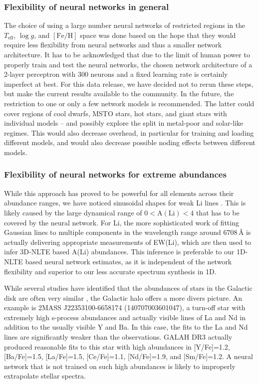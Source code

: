 \documentclass[
  journal=pasa,
  manuscript=research-paper, %
  year=2024,
  volume=37
]{cup-journal}
\newcommand{\Teff}{$T_\mathrm{eff}$\xspace}
\newcommand{\logg}{$\log g$\xspace}
\newcommand{\feh}{$\mathrm{[Fe/H]}$\xspace}
\newcommand{\TLF}{\Teff, \logg, and \feh}
\begin{document}
\subsubsection{Flexibility of neural networks in general}

The choice of using a large number neural networks of restricted regions in the \TLF space was done based on the hope that they would require less flexibility from neural networks and thus a smaller network architecture. It has to be acknowledged that due to the limit of human power to properly train and test the neural networks, the chosen network architecture of a 2-layer perceptron with 300 neurons and a fixed learning rate is certainly imperfect at best. For this data release, we have decided not to rerun these steps, but make the current results available to the community. In the future, the restriction to one or only a few network models is recommended. The latter could cover regions of cool dwarfs, MSTO stars, hot stars, and giant stars with individual models -- and possibly explore the split in metal-poor and solar-like regimes. This would also decrease overhead, in particular for training and loading different models, and would also decrease possible noding effects between different models.

\subsubsection{Flexibility of neural networks for extreme abundances}

While this approach has proved to be powerful for all elements across their abundance ranges, we have noticed sinusoidal shapes for weak Li lines \citep[see also][]{Wang2020}. This is likely caused by the large dynamical range of $0 < \mathrm{A(Li)} < 4$ that has to be covered by the neural network. For Li, the more sophisticated work of fitting Gaussian lines to multiple components in the wavelength range around $6708\,\text{\AA}$ is actually delivering appropriate measurements of EW(Li), which are then used to infer 3D-NLTE based A(Li) abundances. This inference is preferable to our 1D-NLTE based neural network estimates, as it is independent of the network flexibility and superior to our less accurate spectrum synthesis in 1D.

While several studies have identified that the abundances of stars in the Galactic disk are often very similar \citep[e.g.][]{Ness2019b}, the Galactic halo offers a more divers picture. An example is 2MASS J22353100-6658174 (140707003601047), a turn-off star with extremely high s-process abundances and actually visible lines of La and Nd in addition to the usually visible Y and Ba. In this case, the fits to the La and Nd lines are significantly weaker than the observations. GALAH DR3 actually produced reasonable fits to this star with high abundances in [Y/Fe]=1.2, [Ba/Fe]=1.5, [La/Fe]=1.5, [Ce/Fe]=1.1, [Nd/Fe]=1.9, and [Sm/Fe]=1.2. A neural network that is not trained on such high abundances is likely to improperly extrapolate stellar spectra.
\end{document}
